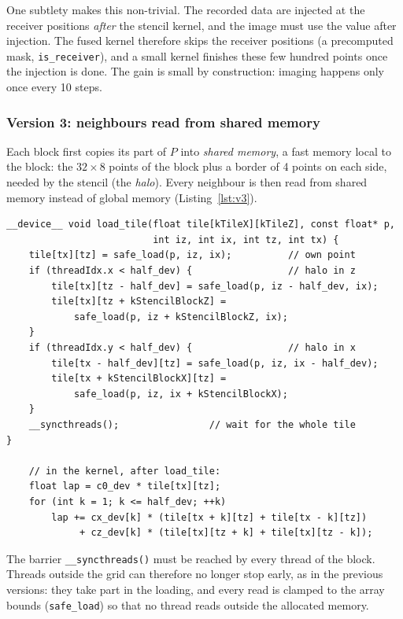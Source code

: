 \documentclass[letterpaper,11pt,leqno]{article}
\begin{document}
One subtlety makes this non-trivial. The recorded data are injected at the
receiver positions \emph{after} the stencil kernel, and the image must use
the value after injection. The fused kernel therefore skips the receiver
positions (a precomputed mask, \texttt{is\_receiver}), and a small kernel
finishes these few hundred points once the injection is done. The gain is
small by construction: imaging happens only once every 10 steps.

\subsubsection{Version 3: neighbours read from shared memory}

Each block first copies its part of $P$ into \emph{shared memory}, a fast
memory local to the block: the $32 \times 8$ points of the block plus a
border of 4 points on each side, needed by the stencil (the \emph{halo}).
Every neighbour is then read from shared memory instead of global memory
(Listing~\ref{lst:v3}).

\noindent\begin{minipage}{\linewidth}
\begin{lstlisting}[style=cuda, caption={Version 3: loading the tile, then computing the Laplacian from it.}, label={lst:v3}]
__device__ void load_tile(float tile[kTileX][kTileZ], const float* p,
                          int iz, int ix, int tz, int tx) {
    tile[tx][tz] = safe_load(p, iz, ix);          // own point
    if (threadIdx.x < half_dev) {                 // halo in z
        tile[tx][tz - half_dev] = safe_load(p, iz - half_dev, ix);
        tile[tx][tz + kStencilBlockZ] =
            safe_load(p, iz + kStencilBlockZ, ix);
    }
    if (threadIdx.y < half_dev) {                 // halo in x
        tile[tx - half_dev][tz] = safe_load(p, iz, ix - half_dev);
        tile[tx + kStencilBlockX][tz] =
            safe_load(p, iz, ix + kStencilBlockX);
    }
    __syncthreads();                // wait for the whole tile
}

    // in the kernel, after load_tile:
    float lap = c0_dev * tile[tx][tz];
    for (int k = 1; k <= half_dev; ++k)
        lap += cx_dev[k] * (tile[tx + k][tz] + tile[tx - k][tz])
             + cz_dev[k] * (tile[tx][tz + k] + tile[tx][tz - k]);
\end{lstlisting}
\end{minipage}

The barrier \texttt{\_\_syncthreads()} must be reached by every thread of the
block. Threads outside the grid can therefore no longer stop early, as in the
previous versions: they take part in the loading, and every read is clamped
to the array bounds (\texttt{safe\_load}) so that no thread reads outside the
allocated memory.
\end{document}
